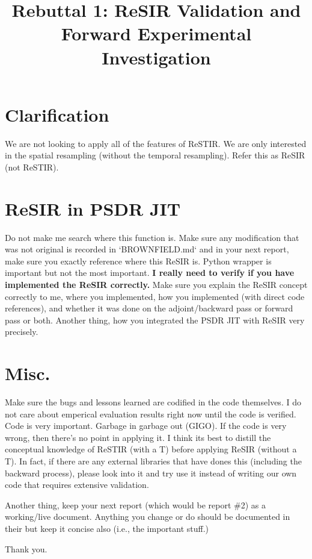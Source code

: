 \title{Rebuttal 1: ReSIR Validation and Forward Experimental Investigation}

\maketitle

\section{Clarification}

We are not looking to apply all of the features of ReSTIR. We are only interested in the
spatial resampling (without the temporal resampling). Refer this as ReSIR (not ReSTIR).

\section{ReSIR in PSDR JIT}

Do not make me search where this function is. Make sure any modification that was not original is recorded in `BROWNFIELD.md` and in your next report, make sure you exactly reference where this ReSIR is. Python wrapper is important but not the most important. \textbf{I really need to verify if you have implemented the ReSIR correctly.} Make sure you explain the ReSIR concept correctly to me, where you implemented, how you implemented (with direct code references), and whether it was done on the adjoint/backward pass or forward pass or both. Another thing, how you integrated the PSDR JIT with ReSIR very precisely.

\section{Misc.}

Make sure the bugs and lessons learned are codified in the code themselves. I do not care about emperical evaluation results right now until the code is verified. Code is very important. Garbage in garbage out (GIGO). If the code is very wrong, then there's no point in applying it. I think its best to distill the conceptual knowledge of ReSTIR (with a T) before applying ReSIR (without a T). In fact, if there are any external libraries that have dones this (including the backward process), please look into it and try use it instead of writing our own code that requires extensive validation.

Another thing, keep your next report (which would be report \#2) as a working/live document. Anything you change or do should be documented in their but keep it concise also (i.e., the important stuff.)

Thank you.
